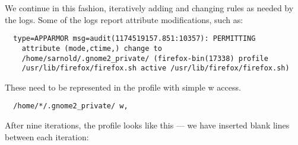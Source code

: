 \documentclass[a4paper]{article}
\begin{document}
We continue in this fashion, iteratively adding and changing rules as
needed by the logs. Some of the logs report attribute modifications,
such as:

\begin{small}
\begin{verbatim}
  type=APPARMOR msg=audit(1174519157.851:10357): PERMITTING
    attribute (mode,ctime,) change to
    /home/sarnold/.gnome2_private/ (firefox-bin(17338) profile
    /usr/lib/firefox/firefox.sh active /usr/lib/firefox/firefox.sh)
\end{verbatim}
\end{small}

These need to be represented in the profile with simple w access.

\begin{small}
\begin{verbatim}
  /home/*/.gnome2_private/ w,
\end{verbatim}
\end{small}

After nine iterations, the profile looks like this --- we have inserted
blank lines between each iteration:
\end{document}
